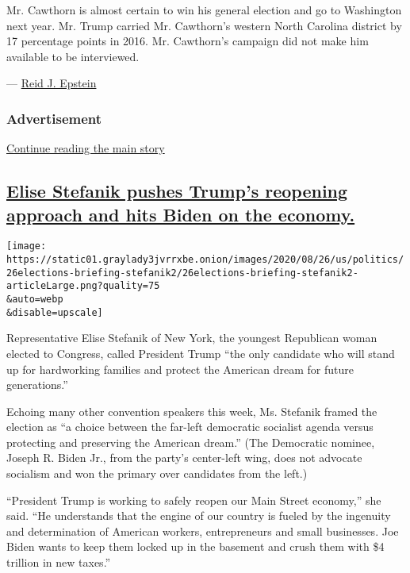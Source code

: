 Mr. Cawthorn is almost certain to win his general election and go to
Washington next year. Mr. Trump carried Mr. Cawthorn's western North
Carolina district by 17 percentage points in 2016. Mr. Cawthorn's
campaign did not make him available to be interviewed.

--- \href{https://www.nytimes3xbfgragh.onion/by/reid-j-epstein}{Reid J.
Epstein}

\hypertarget{advertisement-3}{%
\subsubsection{Advertisement}\label{advertisement-3}}

\protect\hyperlink{after-dfp-ad-mid4}{Continue reading the main story}

\hypertarget{elise-stefanik-pushes-trumps-reopening-approach-and-hits-biden-on-the-economy}{%
\subsection{\texorpdfstring{\protect\hyperlink{elise-stefanik-pushes-trumps-reopening-approach-and-hits-biden-on-the-economy}{Elise
Stefanik pushes Trump's reopening approach and hits Biden on the
economy.}}{Elise Stefanik pushes Trump's reopening approach and hits Biden on the economy.}}\label{elise-stefanik-pushes-trumps-reopening-approach-and-hits-biden-on-the-economy}}

\texttt{[image: https://static01.graylady3jvrrxbe.onion/images/2020/08/26/us/politics/26elections-briefing-stefanik2/26elections-briefing-stefanik2-articleLarge.png?quality=75\\\&auto=webp\\\&disable=upscale]}

Representative Elise Stefanik of New York, the youngest Republican woman
elected to Congress, called President Trump ``the only candidate who
will stand up for hardworking families and protect the American dream
for future generations.''

Echoing many other convention speakers this week, Ms. Stefanik framed
the election as ``a choice between the far-left democratic socialist
agenda versus protecting and preserving the American dream.'' (The
Democratic nominee, Joseph R. Biden Jr., from the party's center-left
wing, does not advocate socialism and won the primary over candidates
from the left.)

``President Trump is working to safely reopen our Main Street economy,''
she said. ``He understands that the engine of our country is fueled by
the ingenuity and determination of American workers, entrepreneurs and
small businesses. Joe Biden wants to keep them locked up in the basement
and crush them with \$4 trillion in new taxes.''

